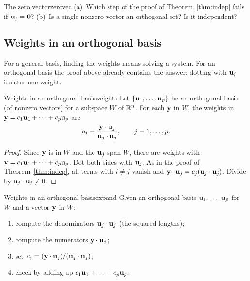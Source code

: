 \documentclass[11pt]{article}
\begin{document}
\begin{think}{The zero vector}{zerovec}
(a)~Which step of the proof of Theorem~\ref{thm:indep} fails if $\mathbf{u}_j=\mathbf{0}$? (b)~Is a single nonzero vector an orthogonal set? Is it independent?
\end{think}

\subsection*{Weights in an orthogonal basis}

For a general basis, finding the weights means solving a system. For an orthogonal basis the proof above already contains the answer: dotting with $\mathbf{u}_j$ isolates one weight.

\begin{thm}{Weights in an orthogonal basis}{weights}
Let $\{\mathbf{u}_1,\dots,\mathbf{u}_p\}$ be an orthogonal basis (of nonzero vectors) for a subspace $W$ of $\mathbb{R}^n$. For each $\mathbf{y}$ in $W$, the weights in $\mathbf{y}=c_1\mathbf{u}_1+\cdots+c_p\mathbf{u}_p$ are
\[
c_j=\frac{\mathbf{y}\cdot\mathbf{u}_j}{\mathbf{u}_j\cdot\mathbf{u}_j},\qquad j=1,\dots,p .
\]
\end{thm}

\begin{proof}
Since $\mathbf{y}$ is in $W$ and the $\mathbf{u}_j$ span $W$, there are weights with $\mathbf{y}=c_1\mathbf{u}_1+\cdots+c_p\mathbf{u}_p$. Dot both sides with $\mathbf{u}_j$. As in the proof of Theorem~\ref{thm:indep}, all terms with $i\neq j$ vanish and $\mathbf{y}\cdot\mathbf{u}_j=c_j(\mathbf{u}_j\cdot\mathbf{u}_j)$. Divide by $\mathbf{u}_j\cdot\mathbf{u}_j\neq0$.
\end{proof}

\begin{proc}{Weights in an orthogonal basis}{expand}
Given an orthogonal basis $\mathbf{u}_1,\dots,\mathbf{u}_p$ for $W$ and a vector $\mathbf{y}$ in $W$:
\begin{enumerate}[nosep]
  \item compute the denominators $\mathbf{u}_j\cdot\mathbf{u}_j$ (the squared lengths);
  \item compute the numerators $\mathbf{y}\cdot\mathbf{u}_j$;
  \item set $c_j=(\mathbf{y}\cdot\mathbf{u}_j)/(\mathbf{u}_j\cdot\mathbf{u}_j)$;
  \item check by adding up $c_1\mathbf{u}_1+\cdots+c_p\mathbf{u}_p$.
\end{enumerate}
\end{proc}
\end{document}
